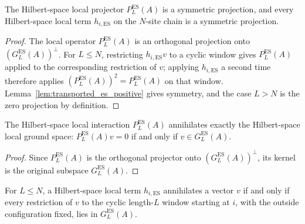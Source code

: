 \begin{lemma}
    \label{lem:transported_es_local_projections}
    \leanok
    The Hilbert-space local projector $P_L^{\mathrm{ES}}(A)$ is a symmetric
    projection, and every Hilbert-space local term $h_{i,\mathrm{ES}}$ on the
    $N$-site chain is a symmetric projection.
\end{lemma}

\begin{proof}
    \leanok
    The local operator $P_L^{\mathrm{ES}}(A)$ is an orthogonal projection onto
    $(G_L^{\mathrm{ES}}(A))^\perp$. For $L\le N$, restricting
    $h_{i,\mathrm{ES}}v$ to a cyclic window gives
    $P_L^{\mathrm{ES}}(A)$ applied to the corresponding restriction of $v$;
    applying $h_{i,\mathrm{ES}}$ a second time therefore applies
    $(P_L^{\mathrm{ES}}(A))^2=P_L^{\mathrm{ES}}(A)$ on that window.
    Lemma~\ref{lem:transported_es_positive} gives symmetry, and the case
    $L>N$ is the zero projection by definition.
\end{proof}

\begin{lemma}
    \label{lem:parent_interaction_es_kernel}
    \leanok
    The Hilbert-space local interaction $P_L^{\mathrm{ES}}(A)$ annihilates
    exactly the Hilbert-space local ground space:
    $P_L^{\mathrm{ES}}(A)v=0$ if and only if
    $v\in G_L^{\mathrm{ES}}(A)$.
\end{lemma}

\begin{proof}
    \leanok
    Since $P_L^{\mathrm{ES}}(A)$ is the orthogonal projector onto
    $(G_L^{\mathrm{ES}}(A))^\perp$, its kernel is the original subspace
    $G_L^{\mathrm{ES}}(A)$.
\end{proof}

\begin{lemma}
    \label{lem:local_term_es_kernel_restrictions}
    \leanok
    For $L\le N$, a Hilbert-space local term $h_{i,\mathrm{ES}}$ annihilates a
    vector $v$ if and only if every restriction of $v$ to the cyclic length-$L$
    window starting at $i$, with the outside configuration fixed, lies in
    $G_L^{\mathrm{ES}}(A)$.
\end{lemma}

